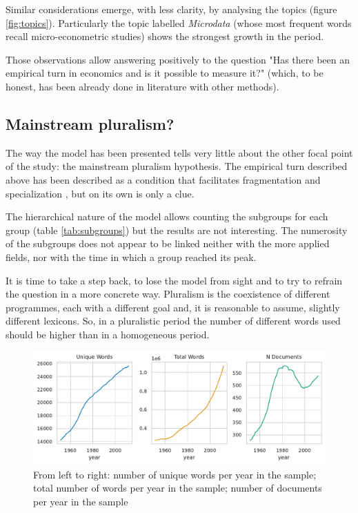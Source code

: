 \documentclass[a4paper, 11pt, headings=standardclasses, tablecaptionsbelow]{scrartcl}
\begin{document}
Similar considerations emerge, with less clarity, by analysing the topics (figure \ref{fig:topics}). Particularly the topic labelled \textit{Microdata} (whose most frequent words recall micro-econometric studies) shows the strongest growth in the period.

Those observations allow answering positively to the question "Has there been an empirical turn in economics and is it possible to measure it?" (which, to be honest, has been already done in literature with other methods).

\subsection{Mainstream pluralism?}
The way the model has been presented tells very little about the other focal point of the study: the mainstream pluralism hypothesis.
The empirical turn described above has been described as a condition that facilitates fragmentation and specialization \parencite{cedrini2018,backhouse2017}, but on its own is only a clue.



The hierarchical nature of the model allows counting the subgroups for each group (table \ref{tab:subgroups}) but the results are not interesting.
The numerosity of the subgroups does not appear to be linked neither with the more applied fields, nor with the time in which a group reached its peak.

It is time to take a step back, to lose the model from sight and to try to refrain the question in a more concrete way. Pluralism is the coexistence of different programmes, each with a different goal and, it is reasonable to assume, slightly different lexicons. So, in a pluralistic period the number of different words used should be higher than in a homogeneous period.

\begin{figure}[tb]
  \centering
  \includegraphics[width=\textwidth]{src/uwords.pdf}
  \caption[Unique Words]{From left to right: number of unique words per year in the sample; total number of words per year in the sample; number of documents per year in the sample}
  \label{fig:uwords}
\end{figure}
\end{document}
